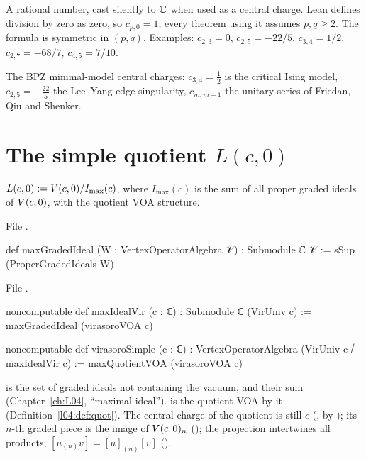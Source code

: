 \begin{dictionary}
A rational number, cast silently to ${\mathbb{C}}$ when used as a central charge. Lean defines division by zero as
zero, so $c_{p,0} = 1$; every theorem using it assumes $p,q\ge2$. The formula is symmetric in $(p,q)$.
Examples: $c_{2,3} = 0$, $c_{2,5} = -22/5$, $c_{3,4} = 1/2$, $c_{2,7} = -68/7$, $c_{4,5} = 7/10$.
\end{dictionary}

\begin{physics}
The BPZ minimal-model central charges: $c_{3,4} = \frac12$ is the critical Ising model,
$c_{2,5} = -\frac{22}5$ the Lee--Yang edge singularity, $c_{m,m+1}$ the unitary series of Friedan, Qiu
and Shenker.
\end{physics}

\section{The simple quotient \texorpdfstring{$L(c,0)$}{L(c,0)}}\label{l06:sec:simple}

\begin{definition}\label{l06:def:simple}
$L(c,0) := V(c,0)/I_{\max}(c)$, where $I_{\max}(c)$ is the sum of all proper graded ideals of $V(c,0)$,
with the quotient VOA structure.
\end{definition}

File .
\begin{leancode}
def maxGradedIdeal (W : VertexOperatorAlgebra 𝒱) : Submodule ℂ 𝒱 :=
  sSup (ProperGradedIdeals W)
\end{leancode}
File .
\begin{leancode}
noncomputable def maxIdealVir (c : ℂ) : Submodule ℂ (VirUniv c) :=
  maxGradedIdeal (virasoroVOA c)

noncomputable def virasoroSimple (c : ℂ) :
    VertexOperatorAlgebra (VirUniv c ⧸ maxIdealVir c) :=
  maxQuotientVOA (virasoroVOA c)
\end{leancode}

\begin{dictionary}
 is the set of graded ideals not containing the vacuum, and  their
sum (Chapter~\ref{ch:L04}, ``maximal ideal'').  is the quotient VOA by it
(Definition~\ref{l04:def:quot}). The central charge of the quotient is still $c$
(\allowbreak{}, by ); its $n$-th graded piece is the image of $V(c,0)_n$
(); the projection intertwines all products, $[u_{(n)}v] = [u]_{(n)}[v]$
(\allowbreak{}\allowbreak{}).
\end{dictionary}

